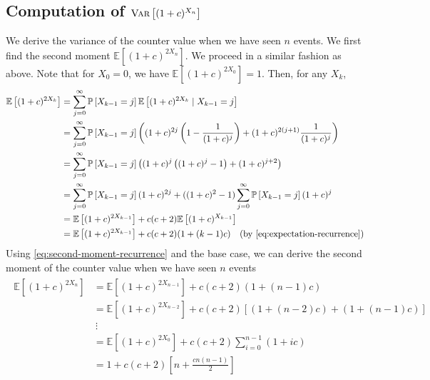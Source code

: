 \documentclass[9pt]{article}
\newcommand{\Probability}[1]{\mathbb{P}\left[ #1 \right]}
\newcommand{\Expectation}[1]{\mathbb{E}\left[ #1 \right]}
\newcommand{\Variance}[1]{\textsc{Var}\left[ #1 \right]}
\begin{document}
\subsection*{\textbf{Computation of} $\Variance{(1 + c)^{X_{n}}}$}
We derive the variance of the counter value when we have seen $n$ events. We first find the
second moment $\Expectation{(1 + c)^{2X_{n}}}$. We proceed in a similar fashion as above.
Note that for $X_{0} = 0$, we have $\Expectation{(1 + c)^{2X_{0}}} = 1$. Then, for any $X_{k}$,
\begin{align}
    \label{eq:second-moment-recurrence}
    \begin{split}
        \Expectation{(1 + c)^{2X_{k}}}
        &= \sum_{j = 0}^{\infty} \Probability{X_{k-1} = j} \Expectation{(1 + c)^{2X_{k}} \mid X_{k-1} = j} \\
        &= \sum_{j = 0}^{\infty} \Probability{X_{k-1} = j} \left( (1 + c)^{2j}
        \left( 1 - \frac{1}{(1 + c)^{j}} \right) + (1 + c)^{2(j+1)} \frac{1}{(1 + c)^{j}} \right) \\
        &= \sum_{j = 0}^{\infty} \Probability{X_{k-1} = j} \left( (1 + c)^{j}
        \left( (1 + c)^{j} - 1 \right) + (1 + c)^{j + 2} \right) \\
        &= \sum_{j = 0}^{\infty} \Probability{X_{k-1} = j} (1 + c)^{2j} + ((1 + c)^{2} - 1)
        \sum_{j = 0}^{\infty} \Probability{X_{k-1} = j} (1 + c)^{j} \\
        &= \Expectation{(1 + c)^{2X_{k-1}}} + c (c + 2) \Expectation{(1 + c)^{X_{k-1}}} \\
        &= \Expectation{(1 + c)^{2X_{k-1}}} + c (c + 2) (1 + (k-1)c)
        \quad \text{(by \eqref{eq:expectation-recurrence})}
    \end{split}
\end{align}
Using \eqref{eq:second-moment-recurrence} and the base case, we can derive the second
moment of the counter value when we have seen $n$ events
\begin{align}
    \begin{split}
        \Expectation{(1 + c)^{2X_{n}}} &= \Expectation{(1 + c)^{2X_{n-1}}} + c (c + 2) (1 + (n-1)c) \\
        &= \Expectation{(1 + c)^{2X_{n-2}}} + c (c + 2) \left[ (1 + (n-2)c) + (1 + (n-1)c) \right] \\
        &\ \vdots \\
        &= \Expectation{(1 + c)^{2X_{0}}} + c (c + 2) \sum_{i=0}^{n-1} (1 + ic) \\
        &= 1 + c (c + 2) \left[ n + \frac{cn(n-1)}{2} \right]
    \end{split}
\end{align}
\end{document}
